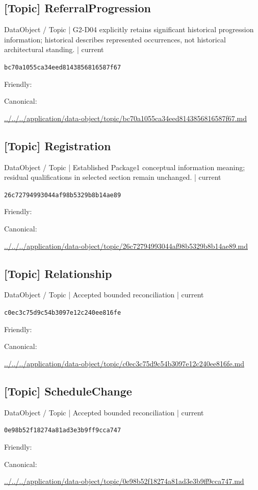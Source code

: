 \documentclass[10pt,a4paper]{article}
\begin{document}
\subsection*{[Topic] ReferralProgression}
{\small DataObject / Topic | G2-D04 explicitly retains significant historical progression information; historical describes represented occurrences, not historical architectural standing. | current}\par
\texttt{bc70a1055ca34eed8143856816587f67}\par
Friendly: \par
Canonical: \par
{\footnotesize\url{../../../application/data-object/topic/bc70a1055ca34eed8143856816587f67.md}}\par
\subsection*{[Topic] Registration}
{\small DataObject / Topic | Established Package1 conceptual information meaning; residual qualifications in selected section remain unchanged. | current}\par
\texttt{26c72794993044af98b5329b8b14ae89}\par
Friendly: \par
Canonical: \par
{\footnotesize\url{../../../application/data-object/topic/26c72794993044af98b5329b8b14ae89.md}}\par
\subsection*{[Topic] Relationship}
{\small DataObject / Topic | Accepted bounded reconciliation | current}\par
\texttt{c0ec3c75d9c54b3097e12c240ee816fe}\par
Friendly: \par
Canonical: \par
{\footnotesize\url{../../../application/data-object/topic/c0ec3c75d9c54b3097e12c240ee816fe.md}}\par
\subsection*{[Topic] ScheduleChange}
{\small DataObject / Topic | Accepted bounded reconciliation | current}\par
\texttt{0e98b52f18274a81ad3e3b9ff9cca747}\par
Friendly: \par
Canonical: \par
{\footnotesize\url{../../../application/data-object/topic/0e98b52f18274a81ad3e3b9ff9cca747.md}}\par
\end{document}
